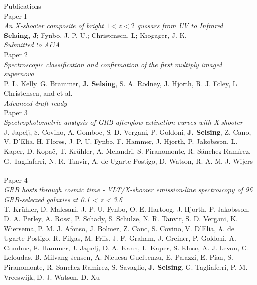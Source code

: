 {\Large Publications} \\

{\large Paper I} \\
\textit{An X-shooter composite of bright $1<z<2$ quasars from UV to Infrared} \\
\textbf{Selsing, J}; Fynbo, J. P. U.; Christensen, L;  Krogager, J.-K. \\
\textit{Submitted to A\&A} \\

{\large Paper 2} \\
\textit{Spectroscopic classification and confirmation of the first multiply imaged supernova}\\
P. L. Kelly, G. Brammer, \textbf{J. Selsing}, S. A. Rodney, J. Hjorth, R. J. Foley, L Christensen, and et al. \\
\textit{Advanced draft ready} \\


{\large Paper 3} \\
\textit{Spectrophotometric analysis of GRB afterglow extinction curves with X-shooter} \\
J. Japelj, S. Covino, A. Gomboc, S. D. Vergani, P. Goldoni,\textbf{ J. Selsing}, Z. Cano, V. D'Elia, H. Flores, J. P. U. Fynbo, F. Hammer, J. Hjorth, P. Jakobsson, L. Kaper, D. Kopač, T. Krühler, A. Melandri, S. Piranomonte, R. Sánchez-Ramírez, G. Tagliaferri, N. R. Tanvir, A. de Ugarte Postigo, D. Watson, R. A. M. J. Wijers \\
\citet{Japelj2015} \\

{\large Paper 4} \\
\textit{GRB hosts through cosmic time - VLT/X-shooter emission-line spectroscopy of 96 GRB-selected galaxies at 0.1 < z < 3.6} \\
T. Krühler, D. Malesani, J. P. U. Fynbo, O. E. Hartoog, J. Hjorth, P. Jakobsson, D. A. Perley, A. Rossi, P. Schady, S. Schulze, N. R. Tanvir, S. D. Vergani, K. Wiersema, P. M. J. Afonso, J. Bolmer, Z. Cano, S. Covino, V. D'Elia, A. de Ugarte Postigo, R. Filgas, M. Friis, J. F. Graham, J. Greiner, P. Goldoni, A. Gomboc, F. Hammer, J. Japelj, D. A. Kann, L. Kaper, S. Klose, A. J. Levan, G. Leloudas, B. Milvang-Jensen, A. Nicuesa Guelbenzu, E. Palazzi, E. Pian, S. Piranomonte, R. Sanchez-Ramirez, S. Savaglio, \textbf{J. Selsing}, G. Tagliaferri, P. M. Vreeswijk, D. J. Watson, D. Xu \\
\citet{Kruhler2015} \\


